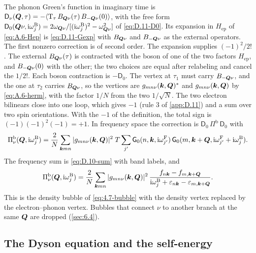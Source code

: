 The phonon Green's function in imaginary time is $\mathsf{D}_\nu(\bm{Q},\tau) = -\langle\mathrm{T}_\tau\,B_{\bm{Q}\nu}(\tau)\,B_{-\bm{Q}\nu}(0)\rangle$, with the free form $\mathsf{D}_0(\bm{Q}\nu,\mathrm{i}\omega^{\mathrm{B}}_j) = 2\omega_{\bm{Q}\nu}/[(\mathrm{i}\omega^{\mathrm{B}}_j)^2 - \omega_{\bm{Q}\nu}^2]$ of \cref{eq:D.11-D0}. Its expansion in $H_{\mathrm{ep}}$ of \cref{eq:A.6-Hep} is \cref{eq:D.11-Gexp} with $B_{\bm{Q}\nu}$ and $B_{-\bm{Q}\nu}$ as the external operators. The first nonzero correction is of second order. The expansion supplies $(-1)^2/2!$. The external $B_{\bm{Q}\nu}(\tau)$ is contracted with the boson of one of the two factors $H_{\mathrm{ep}}$, and $B_{-\bm{Q}\nu}(0)$ with the other; the two choices are equal after relabeling and cancel the $1/2!$. Each boson contraction is $-\mathsf{D}_0$. The vertex at $\tau_1$ must carry $B_{-\bm{Q}\nu}$, and the one at $\tau_2$ carries $B_{\bm{Q}\nu}$, so the vertices are $g_{mn\nu}(\bm{k},\bm{Q})^*$ and $g_{mn\nu}(\bm{k},\bm{Q})$ by \cref{eq:A.6-herm}, with the factor $1/N$ from the two $1/\sqrt N$. The two electron bilinears close into one loop, which gives $-1$ (rule 3 of \cref{app:D.11}) and a sum over two spin orientations. With the $-1$ of the definition, the total sign is $(-1)(-1)^2(-1) = +1$. In frequency space the correction is $\mathsf{D}_0\,\Pi^{\mathrm{b}}\,\mathsf{D}_0$ with
\begin{equation*}
  \Pi^{\mathrm{b}}_\nu(\bm{Q},\mathrm{i}\omega^{\mathrm{B}}_j) = \frac2N\sum_{\bm{k}mn}|g_{mn\nu}(\bm{k},\bm{Q})|^2\;T\sum_{j'}\mathsf{G}_0(n,\bm{k},\mathrm{i}\omega^{\mathrm{F}}_{j'})\,\mathsf{G}_0(m,\bm{k}+\bm{Q},\mathrm{i}\omega^{\mathrm{F}}_{j'} + \mathrm{i}\omega^{\mathrm{B}}_j) .
\end{equation*}
The frequency sum is \cref{eq:D.10-sum} with band labels, and
\begin{equation*}
  \Pi^{\mathrm{b}}_\nu(\bm{Q},\mathrm{i}\omega^{\mathrm{B}}_j) = \frac2N\sum_{\bm{k}mn}|g_{mn\nu}(\bm{k},\bm{Q})|^2\,\frac{f_{n\bm{k}} - f_{m,\bm{k}+\bm{Q}}}{\mathrm{i}\omega^{\mathrm{B}}_j + \varepsilon_{n\bm{k}} - \varepsilon_{m,\bm{k}+\bm{Q}}} .
\end{equation*}
This is the density bubble of \cref{eq:4.7-bubble} with the density vertex replaced by the electron--phonon vertex. Bubbles that connect $\nu$ to another branch at the same $\bm{Q}$ are dropped (\cref{sec:6.4}).

\subsection*{The Dyson equation and the self-energy}

